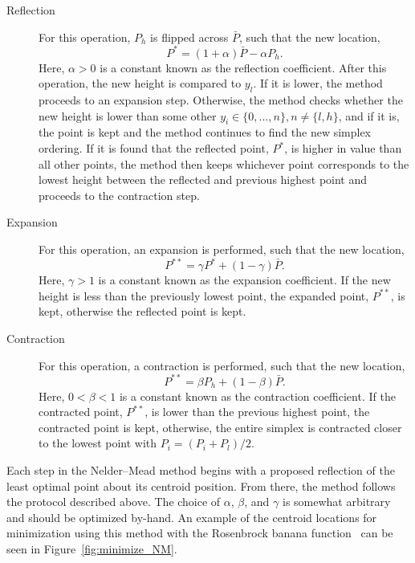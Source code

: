 \begin{description}

\item[Reflection] For this operation, $P_h$ is flipped across $\bar P$, such that the new location,
\begin{equation}
P^* = (1+\alpha)\bar P - \alpha P_h.
\end{equation}
\noindent Here, $\alpha > 0$ is a constant known as the reflection coefficient.
After this operation, the new height is compared to $y_l$.
If it is lower, the method proceeds to an expansion step.
Otherwise, the method checks whether the new height is lower than some other $y_i \in \{0,...,n\},n\neq \{l,h\}$, and if it is, the point is kept and the method continues to find the new simplex ordering.
If it is found that the reflected point, $P^*$, is higher in value than all other points, the method then keeps whichever point corresponds to the lowest height between the reflected and previous highest point and proceeds to the contraction step.

\item[Expansion] For this operation, an expansion is performed, such that the new location,
\begin{equation}
P^{**} = \gamma P^* + (1-\gamma)\bar P.
\end{equation}
\noindent Here, $\gamma > 1$ is a constant known as the expansion coefficient.
If the new height is less than the previously lowest point, the expanded point, $P^{**}$, is kept, otherwise the reflected point is kept.

\item[Contraction] For this operation, a contraction is performed, such that the new location,
\begin{equation}
P^{**} = \beta P_h + (1-\beta)\bar P.
\end{equation}
\noindent Here, $0 < \beta < 1$ is a constant known as the contraction coefficient.
If the contracted point, $P^{**}$, is lower than the previous highest point, the contracted point is kept, otherwise, the entire simplex is contracted closer to the lowest point with $P_i = (P_i + P_l)/2$.
\end{description}

Each step in the Nelder--Mead method begins with a proposed reflection of the least optimal point about its centroid position.
From there, the method follows the protocol described above.
The choice of $\alpha$, $\beta$, and $\gamma$ is somewhat arbitrary and should be optimized by-hand.
An example of the centroid locations for minimization using this method with the Rosenbrock banana function~\cite{pohlheim2007} can be seen in Figure~\ref{fig:minimize_NM}.

